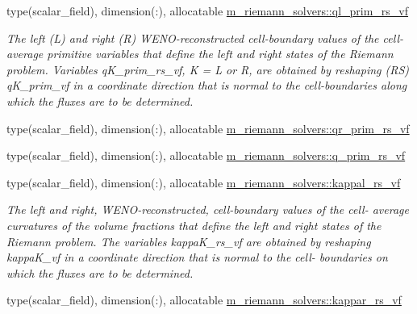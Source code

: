 \begin{DoxyCompactItemize}
\item 
type(scalar\+\_\+field), dimension(\+:), allocatable \hyperlink{namespacem__riemann__solvers_aa4fd04af7adfbb38e425f6e91e041ecc}{m\+\_\+riemann\+\_\+solvers\+::ql\+\_\+prim\+\_\+rs\+\_\+vf}
\begin{DoxyCompactList}\small\item\em The left (L) and right (R) W\+E\+N\+O-\/reconstructed cell-\/boundary values of the cell-\/average primitive variables that define the left and right states of the Riemann problem. Variables q\+K\+\_\+prim\+\_\+rs\+\_\+vf, K = L or R, are obtained by reshaping (RS) q\+K\+\_\+prim\+\_\+vf in a coordinate direction that is normal to the cell-\/boundaries along which the fluxes are to be determined. \end{DoxyCompactList}\item 
type(scalar\+\_\+field), dimension(\+:), allocatable \hyperlink{namespacem__riemann__solvers_a70fefa4f5849fa4c952030b0ac04482a}{m\+\_\+riemann\+\_\+solvers\+::qr\+\_\+prim\+\_\+rs\+\_\+vf}
\item 
type(scalar\+\_\+field), dimension(\+:), allocatable \hyperlink{namespacem__riemann__solvers_afe077d6837688601705ac13df3d9c3dc}{m\+\_\+riemann\+\_\+solvers\+::q\+\_\+prim\+\_\+rs\+\_\+vf}
\end{DoxyCompactItemize}

\textbf{ }\par
\begin{DoxyCompactItemize}
\item 
type(scalar\+\_\+field), dimension(\+:), allocatable \hyperlink{namespacem__riemann__solvers_ac277f9426d7112e2b42fdc0fd6583f5e}{m\+\_\+riemann\+\_\+solvers\+::kappal\+\_\+rs\+\_\+vf}
\begin{DoxyCompactList}\small\item\em The left and right, W\+E\+N\+O-\/reconstructed, cell-\/boundary values of the cell-\/ average curvatures of the volume fractions that define the left and right states of the Riemann problem. The variables kappa\+K\+\_\+rs\+\_\+vf are obtained by reshaping kappa\+K\+\_\+vf in a coordinate direction that is normal to the cell-\/ boundaries on which the fluxes are to be determined. \end{DoxyCompactList}\item 
type(scalar\+\_\+field), dimension(\+:), allocatable \hyperlink{namespacem__riemann__solvers_ae8a2bf891d899a2441210a29da0e03a1}{m\+\_\+riemann\+\_\+solvers\+::kappar\+\_\+rs\+\_\+vf}
\end{DoxyCompactItemize}

